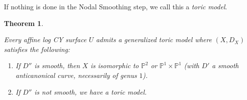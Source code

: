 \documentclass[11pt, reqno]{amsart}
\newtheorem{theorem}{Theorem}[section]
\theoremstyle{definition}
\begin{document}
If nothing is done in the Nodal Smoothing step, we call this a \emph{toric model}.

\begin{theorem}\label{thm-toric-model}

Every affine log CY surface $U$ admits a generalized toric model where $(X, D_X)$ satisfies the following:

\begin{enumerate}

\item If $D''$ is smooth, then $X$ is isomorphic to $\mathbb{P}^2$ or $\mathbb{P}^1\times \mathbb{P}^1$ (with $D'$ a smooth anticanonical curve, necessarily of genus $1$).

\item If $D''$ is not smooth, we have a toric model.

\end{enumerate}

\end{theorem}
\end{document}

